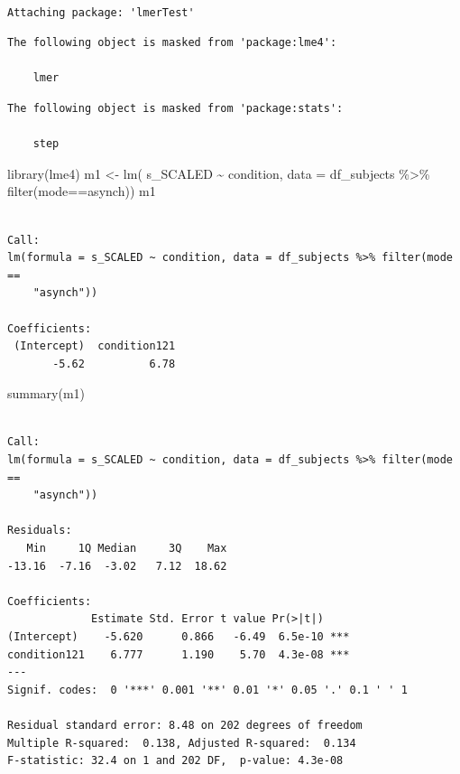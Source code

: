 \documentclass[
  letterpaper,
  DIV=11,
  numbers=noendperiod]{scrreprt}
\newenvironment{Shaded}{\begin{snugshade}}{\end{snugshade}}
\newcommand{\AttributeTok}[1]{\textcolor[rgb]{0.40,0.45,0.13}{#1}}
\newcommand{\FunctionTok}[1]{\textcolor[rgb]{0.28,0.35,0.67}{#1}}
\newcommand{\NormalTok}[1]{\textcolor[rgb]{0.00,0.23,0.31}{#1}}
\newcommand{\OtherTok}[1]{\textcolor[rgb]{0.00,0.23,0.31}{#1}}
\newcommand{\SpecialCharTok}[1]{\textcolor[rgb]{0.37,0.37,0.37}{#1}}
\newcommand{\StringTok}[1]{\textcolor[rgb]{0.13,0.47,0.30}{#1}}
\begin{document}
\begin{verbatim}

Attaching package: 'lmerTest'
\end{verbatim}

\begin{verbatim}
The following object is masked from 'package:lme4':

    lmer
\end{verbatim}

\begin{verbatim}
The following object is masked from 'package:stats':

    step
\end{verbatim}

\begin{Shaded}
\begin{Highlighting}[]
\FunctionTok{library}\NormalTok{(lme4)}
\NormalTok{m1 }\OtherTok{\textless{}{-}} \FunctionTok{lm}\NormalTok{( s\_SCALED }\SpecialCharTok{\textasciitilde{}}\NormalTok{ condition, }\AttributeTok{data =}\NormalTok{ df\_subjects }\SpecialCharTok{\%\textgreater{}\%} \FunctionTok{filter}\NormalTok{(mode}\SpecialCharTok{==}\StringTok{\textquotesingle{}asynch\textquotesingle{}}\NormalTok{))}
\NormalTok{m1}
\end{Highlighting}
\end{Shaded}

\begin{verbatim}

Call:
lm(formula = s_SCALED ~ condition, data = df_subjects %>% filter(mode == 
    "asynch"))

Coefficients:
 (Intercept)  condition121  
       -5.62          6.78  
\end{verbatim}

\begin{Shaded}
\begin{Highlighting}[]
\FunctionTok{summary}\NormalTok{(m1)}
\end{Highlighting}
\end{Shaded}

\begin{verbatim}

Call:
lm(formula = s_SCALED ~ condition, data = df_subjects %>% filter(mode == 
    "asynch"))

Residuals:
   Min     1Q Median     3Q    Max 
-13.16  -7.16  -3.02   7.12  18.62 

Coefficients:
             Estimate Std. Error t value Pr(>|t|)    
(Intercept)    -5.620      0.866   -6.49  6.5e-10 ***
condition121    6.777      1.190    5.70  4.3e-08 ***
---
Signif. codes:  0 '***' 0.001 '**' 0.01 '*' 0.05 '.' 0.1 ' ' 1

Residual standard error: 8.48 on 202 degrees of freedom
Multiple R-squared:  0.138, Adjusted R-squared:  0.134 
F-statistic: 32.4 on 1 and 202 DF,  p-value: 4.3e-08
\end{verbatim}
\end{document}
